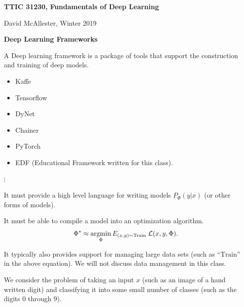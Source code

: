 




{\Huge
  
  \centerline{\bf TTIC 31230, Fundamentals of Deep Learning}
  \bigskip
  \centerline{David McAllester, Winter 2019}
  \vfill
  \vfill
  \centerline{\bf Deep Learning Frameworks}
  \vfill
  \vfill


A Deep learning framework is a package of tools that support the construction and training of deep models.

\begin{itemize}
  
\item Kaffe

\vfill

\item Tensorflow

\vfill

\item DyNet

  \vfill
\item Chainer

\vfill

\item PyTorch

  \vfill

\item EDF (Educational Framework written for this class).
\end{itemize}

$\vdots$


It must provide a high level language for writing models $P_\Phi(y|x)$ (or other forms of models).

\vfill
It must be able to compile a model into an optimization algorithm.
\vfill
$$\Phi^* \approx \operatorname*{argmin}_\Phi E_{(x,y) \sim \mathrm{Train}} \; {\cal L}(x,y,\Phi).$$

\vfill
It typically also provides support for managing large data sets (such as ``$\mathrm{Train}$'' in the above equation).  We will not discuss data management in this class.


We consider the problem of taking an input $x$ (such as an image of a hand written digit) and classifying it into some small number of classes (such as the digits $0$ through $9$).

}
